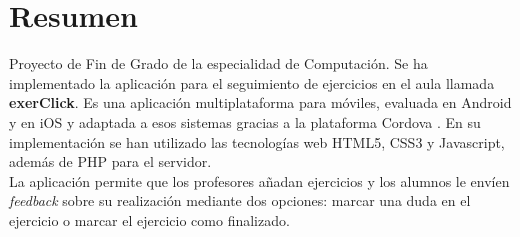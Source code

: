 \section*{Resumen}

Proyecto de Fin de Grado de la especialidad de Computación. Se ha implementado la aplicación para el seguimiento de ejercicios en el aula llamada \textbf{exerClick}. Es una aplicación multiplataforma para móviles, evaluada en Android y en iOS y adaptada a esos sistemas gracias a la plataforma Cordova \cite{apachecordova}. En su implementación se han utilizado las tecnologías web HTML5, CSS3 y Javascript, además de PHP para el servidor.\\

La aplicación permite que los profesores añadan ejercicios y los alumnos le envíen \textit{feedback} sobre su realización mediante dos opciones: marcar una duda en el ejercicio o marcar el ejercicio como finalizado.\\